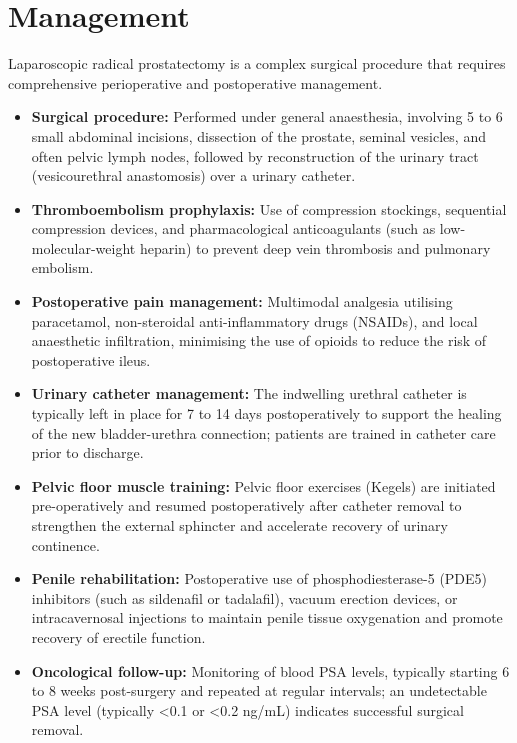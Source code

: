 \section*{Management}
Laparoscopic radical prostatectomy is a complex surgical procedure that requires comprehensive perioperative and postoperative management.
\begin{itemize}
    \item \textbf{Surgical procedure:} Performed under general anaesthesia, involving 5 to 6 small abdominal incisions, dissection of the prostate, seminal vesicles, and often pelvic lymph nodes, followed by reconstruction of the urinary tract (vesicourethral anastomosis) over a urinary catheter.
    \item \textbf{Thromboembolism prophylaxis:} Use of compression stockings, sequential compression devices, and pharmacological anticoagulants (such as low-molecular-weight heparin) to prevent deep vein thrombosis and pulmonary embolism.
    \item \textbf{Postoperative pain management:} Multimodal analgesia utilising paracetamol, non-steroidal anti-inflammatory drugs (NSAIDs), and local anaesthetic infiltration, minimising the use of opioids to reduce the risk of postoperative ileus.
    \item \textbf{Urinary catheter management:} The indwelling urethral catheter is typically left in place for 7 to 14 days postoperatively to support the healing of the new bladder-urethra connection; patients are trained in catheter care prior to discharge.
    \item \textbf{Pelvic floor muscle training:} Pelvic floor exercises (Kegels) are initiated pre-operatively and resumed postoperatively after catheter removal to strengthen the external sphincter and accelerate recovery of urinary continence.
    \item \textbf{Penile rehabilitation:} Postoperative use of phosphodiesterase-5 (PDE5) inhibitors (such as sildenafil or tadalafil), vacuum erection devices, or intracavernosal injections to maintain penile tissue oxygenation and promote recovery of erectile function.
    \item \textbf{Oncological follow-up:} Monitoring of blood PSA levels, typically starting 6 to 8 weeks post-surgery and repeated at regular intervals; an undetectable PSA level (typically <0.1 or <0.2 ng/mL) indicates successful surgical removal.
\end{itemize}

